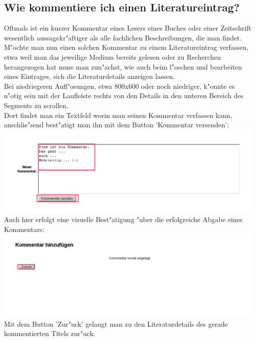 \subsection{Wie kommentiere ich einen Literatureintrag?}
Oftmals ist ein kurzer Kommentar eines Lesers eines Buches oder einer Zeitschrift wesentlich aussagekr"aftiger als alle fachlichen Beschreibungen, die man findet.\\
M"ochte man nun einen solchen Kommentar zu einem Literatureintrag verfassen, etwa weil man das jeweilige Medium bereits gelesen oder zu Recherchen herangezogen hat muss man zun"achst, wie auch beim l"oschen und bearbeiten eines Eintrages, sich die Literaturdetails anzeigen lassen.\\
Bei niedriegeren Aufl"osungen, etwa 800x600 oder noch niedriger, k"onnte es n"otig sein mit der Laufleiste rechts von den Details in den unteren Bereich des Segments zu scrollen.\\
Dort findet man ein Textfeld worin man seinen Kommentar verfassen kann, anschlie"send best"atigt man ihn mit dem Button 'Kommentar versenden':\\
\includegraphics[scale=0.8]{comment1}\\
Auch hier erfolgt eine visuelle Best"atigung "uber die erfolgreiche Abgabe eines Kommentars:
\includegraphics[scale=0.8]{comment2}\\
Mit dem Button 'Zur"uck' gelangt man zu den Literaturdetails des gerade kommentierten Titels zur"uck.\\

